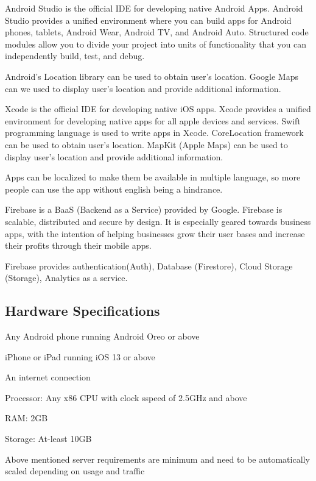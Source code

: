 \documentclass[../Report.tex]{subfiles}
\begin{document}
\begin{description}
  \item[Android Studio: ] Android Studio is the official IDE for developing native Android Apps. Android Studio provides a unified  
  environment where you can build apps for Android phones, tablets, Android Wear, Android TV, and Android Auto. Structured code modules 
  allow you to  divide your project into units of functionality that you can independently build, test, and debug.\par
  Android's Location library can be used to obtain user's location. Google Maps can we used to display user's location and provide 
  additional information.

  \item[Xcode: ] Xcode is the official IDE for developing native iOS apps. Xcode provides a unified environment for developing native apps 
  for all apple devices and services. Swift programming language is used to write apps in Xcode. CoreLocation framework can be used to 
  obtain user's location. MapKit (Apple Maps) can be used to display user's location and provide additional information.\par

  \item Apps can be localized to make them be available in multiple language, so more people can use the app without english being a 
  hindrance.

  \item[Firebase: ] Firebase is a BaaS (Backend as a Service) provided by Google. Firebase is scalable, distributed and secure by design. It is especially
  geared towards business apps, with the intention of helping businesses grow their user bases and increase their profits through their mobile apps.\par
  Firebase provides authentication(Auth), Database (Firestore), Cloud Storage (Storage), Analytics as a service.
\end{description}

\subsection{Hardware Specifications}
\begin{description}
  \item[User Device Requirements: ]
  \item Any Android phone running Android Oreo or above
  \item iPhone or iPad running iOS 13 or above
  \item An internet connection
  \item 
  
  \item [Minimum Server Requirements: ]
  \item Processor: Any x86 CPU with clock sspeed of 2.5GHz and above
  \item RAM: 2GB
  \item Storage: At-least 10GB
\end{description}
Above mentioned server requirements are minimum and need to be automatically scaled depending on usage and traffic
\end{document}
